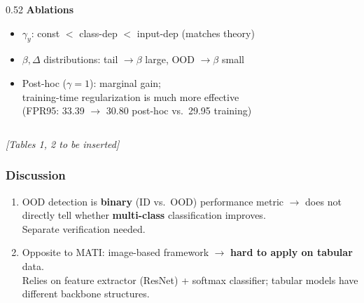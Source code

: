 \documentclass[10pt,aspectratio=169]{beamer}
\begin{document}
\begin{frame}
{\begin{columns}[T]
\begin{column}{0.52\textwidth}
\vspace{3pt}
\textbf{Ablations}
{\scriptsize
\begin{itemize}\setlength\itemsep{2pt}
  \item $\gamma_y$: const $<$ class-dep $<$ input-dep (matches theory)
  \item $\beta,\Delta$ distributions: tail $\rightarrow\beta$ large, OOD $\rightarrow\beta$ small
  \item Post-hoc ($\gamma\!=\!1$): marginal gain;\\
        training-time regularization is much more effective\\
        {\tiny (FPR95: 33.39 $\rightarrow$ 30.80 post-hoc vs.\ 29.95 training)}
\end{itemize}
}
\end{column}
\end{columns}
\vspace{4pt}
\begin{center}
{\footnotesize \textit{[Tables 1, 2 to be inserted]}}
\end{center}
}
\end{frame}

\begin{frame}
\frametitle{Discussion}
{\small
\begin{enumerate}\setlength\itemsep{12pt}
  \item OOD detection is \textbf{binary} (ID vs.\ OOD) performance metric $\rightarrow$ does not directly tell whether \textbf{multi-class} classification improves.\\ Separate verification needed.

  \item Opposite to MATI: image-based framework $\rightarrow$ \textbf{hard to apply on tabular} data.\\
        {\scriptsize Relies on feature extractor (ResNet) + softmax classifier; tabular models have different backbone structures.}
\end{enumerate}
}
\end{frame}



\end{document}
